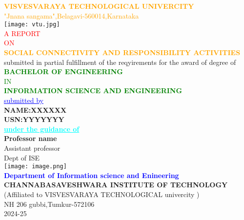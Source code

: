 \documentclass[12pt,a4paper]{article}
\begin{document}
  \begin{center}
      \textcolor{orange}{\large\textbf{VISVESVARAYA TECHNOLOGICAL UNIVERCITY}\\"Jnana sangama",Belagavi-560014,Karnataka}\\
      \vspace{2mm}
    \texttt{[image: vtu.jpg]}\\
    \vspace{2mm}
      \textcolor{red}{A REPORT}\\
      \textcolor{red}{ON}\\
      \textcolor{orange}{\textbf{SOCIAL CONNECTIVITY AND RESPONSIBILITY ACTIVITIES}}\\
      \small{submitted in partial fulfillment of the reqyirements for the award of degree of }\\
      \vspace{5mm}
      \textcolor{green}{\textbf{BACHELOR OF ENGINEERING}\\
IN\\
\textbf{INFORMATION SCIENCE AND ENGINEERING}}\\
\vspace{5mm}
\textcolor{blue}{\underline{submitted by}}\\
\textbf{NAME:XXXXXX}\\
\textbf{USN:YYYYYYY}\\
\vspace{5mm}
\textcolor{cyan}{\underline{{\textbf{under the guidance of}}}}\\
\large\textbf{Professor name}\\
Assistant professor\\
Dept of ISE\\
\centering\texttt{[image: image.png]}\\
\textcolor{blue}{\textbf{Department of Information science and Enineering}}\\
\textbf{}{\textbf{CHANNABASAVESHWARA INSTITUTE OF TECHNOLOGY}}\\
(Affiliated to VISVESVARAYA TECHNOLOGICAL univercity )\\
NH 206 gubbi,Tumkur-572106\\
2024-25
%
      \end{center}
\end{document}
